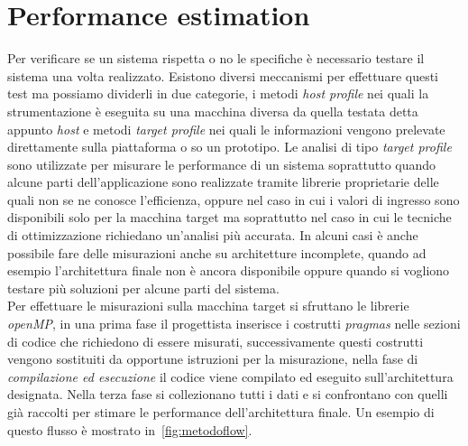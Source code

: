 \section{Performance estimation}\label{capitolo4}
Per verificare se un sistema rispetta o no le specifiche è necessario testare il sistema una volta realizzato. Esistono diversi meccanismi per effettuare questi test ma possiamo dividerli in due categorie, i metodi \emph{host profile} nei quali la strumentazione è eseguita su una macchina diversa da quella testata detta appunto \emph{host} e  metodi \emph{target profile} nei quali le informazioni vengono prelevate direttamente sulla piattaforma o so un prototipo. Le analisi di tipo \emph{target profile} sono utilizzate per misurare le performance di un sistema soprattutto quando alcune parti dell'applicazione sono realizzate tramite librerie proprietarie delle quali non se ne conosce l'efficienza, oppure nel caso in cui i valori di ingresso sono disponibili solo per la macchina target ma soprattutto nel caso in cui le tecniche di ottimizzazione richiedano un'analisi più accurata. In alcuni casi è anche possibile fare delle misurazioni anche su architetture incomplete, quando ad esempio l'architettura finale non è ancora disponibile oppure quando si vogliono testare più soluzioni per alcune parti del sistema.\\
Per effettuare le misurazioni sulla macchina target si sfruttano le librerie \emph{openMP}, in una prima fase il progettista inserisce i costrutti \emph{pragmas} nelle sezioni di codice che richiedono di essere misurati, successivamente questi costrutti vengono sostituiti da opportune istruzioni per la misurazione, nella fase di \emph{compilazione ed esecuzione} il codice viene compilato ed eseguito sull'architettura designata. Nella terza fase si collezionano tutti i dati e si confrontano con quelli già raccolti per stimare le performance dell'architettura finale. Un esempio di questo flusso è mostrato in \figurename\,\ref{fig:metodoflow}.\\
